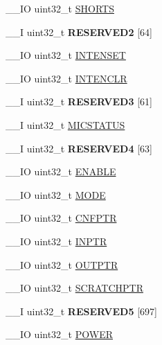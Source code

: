 \begin{DoxyCompactItemize}
\item 
\+\_\+\+\_\+\+I\+O uint32\+\_\+t \hyperlink{struct_n_r_f___c_c_m___type_a8e9009050d486669c06040e3fbb03480}{S\+H\+O\+R\+T\+S}
\item 
\hypertarget{struct_n_r_f___c_c_m___type_a313655f8bf536757e114721b5ed67abb}{}\+\_\+\+\_\+\+I uint32\+\_\+t {\bfseries R\+E\+S\+E\+R\+V\+E\+D2} \mbox{[}64\mbox{]}\label{struct_n_r_f___c_c_m___type_a313655f8bf536757e114721b5ed67abb}

\item 
\+\_\+\+\_\+\+I\+O uint32\+\_\+t \hyperlink{struct_n_r_f___c_c_m___type_a8f1c101c4fd7a2b467b577cbafd0fa63}{I\+N\+T\+E\+N\+S\+E\+T}
\item 
\+\_\+\+\_\+\+I\+O uint32\+\_\+t \hyperlink{struct_n_r_f___c_c_m___type_a8aca79d8fcff4ffa8e86daadbc129cf8}{I\+N\+T\+E\+N\+C\+L\+R}
\item 
\hypertarget{struct_n_r_f___c_c_m___type_ada40c77b264ee91a083badc07b79864b}{}\+\_\+\+\_\+\+I uint32\+\_\+t {\bfseries R\+E\+S\+E\+R\+V\+E\+D3} \mbox{[}61\mbox{]}\label{struct_n_r_f___c_c_m___type_ada40c77b264ee91a083badc07b79864b}

\item 
\+\_\+\+\_\+\+I uint32\+\_\+t \hyperlink{struct_n_r_f___c_c_m___type_a0931287fd02302b690023d2b9bcf2841}{M\+I\+C\+S\+T\+A\+T\+U\+S}
\item 
\hypertarget{struct_n_r_f___c_c_m___type_afbd06d1d3116ebb22e35e9b0da843ca7}{}\+\_\+\+\_\+\+I uint32\+\_\+t {\bfseries R\+E\+S\+E\+R\+V\+E\+D4} \mbox{[}63\mbox{]}\label{struct_n_r_f___c_c_m___type_afbd06d1d3116ebb22e35e9b0da843ca7}

\item 
\+\_\+\+\_\+\+I\+O uint32\+\_\+t \hyperlink{struct_n_r_f___c_c_m___type_ad7592fcc8d92f168a9958900343c88fa}{E\+N\+A\+B\+L\+E}
\item 
\+\_\+\+\_\+\+I\+O uint32\+\_\+t \hyperlink{struct_n_r_f___c_c_m___type_a830de27d35211756104dcdf62403fa8d}{M\+O\+D\+E}
\item 
\+\_\+\+\_\+\+I\+O uint32\+\_\+t \hyperlink{struct_n_r_f___c_c_m___type_a3f8ad709ca806dcfbe2016c43d47b155}{C\+N\+F\+P\+T\+R}
\item 
\+\_\+\+\_\+\+I\+O uint32\+\_\+t \hyperlink{struct_n_r_f___c_c_m___type_a70b7918e951623005a878b89cd7f0886}{I\+N\+P\+T\+R}
\item 
\+\_\+\+\_\+\+I\+O uint32\+\_\+t \hyperlink{struct_n_r_f___c_c_m___type_aa0bf67c2e2f890861fe71e3cc09914fa}{O\+U\+T\+P\+T\+R}
\item 
\+\_\+\+\_\+\+I\+O uint32\+\_\+t \hyperlink{struct_n_r_f___c_c_m___type_ad59cdb8722760eb4506c7c1d7176ba48}{S\+C\+R\+A\+T\+C\+H\+P\+T\+R}
\item 
\hypertarget{struct_n_r_f___c_c_m___type_a9dc29d5767a3b8e56ae9b141a0a18f2c}{}\+\_\+\+\_\+\+I uint32\+\_\+t {\bfseries R\+E\+S\+E\+R\+V\+E\+D5} \mbox{[}697\mbox{]}\label{struct_n_r_f___c_c_m___type_a9dc29d5767a3b8e56ae9b141a0a18f2c}

\item 
\+\_\+\+\_\+\+I\+O uint32\+\_\+t \hyperlink{struct_n_r_f___c_c_m___type_ae2b5e83f5566c69365245dd8e639bd7c}{P\+O\+W\+E\+R}
\end{DoxyCompactItemize}


